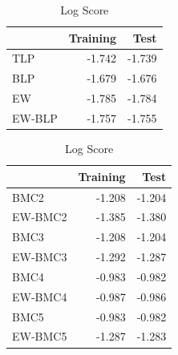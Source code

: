 \documentclass[
]{article}
\begin{document}
\begin{table}[H]
\caption{\label{tab:unnamed-chunk-18}Log Score}

\centering
\fontsize{8}{10}\selectfont
\begin{tabular}[t]{lrr}
\toprule
  & Training & Test\\
\midrule
TLP & -1.742 & -1.739\\
BLP & -1.679 & -1.676\\
EW & -1.785 & -1.784\\
EW-BLP & -1.757 & -1.755\\
\bottomrule
\end{tabular}
\centering
\begin{tabular}[t]{lrr}
\toprule
  & Training & Test\\
\midrule
BMC2 & -1.208 & -1.204\\
EW-BMC2 & -1.385 & -1.380\\
BMC3 & -1.208 & -1.204\\
EW-BMC3 & -1.292 & -1.287\\
BMC4 & -0.983 & -0.982\\
\addlinespace
EW-BMC4 & -0.987 & -0.986\\
BMC5 & -0.983 & -0.982\\
EW-BMC5 & -1.287 & -1.283\\
\bottomrule
\end{tabular}
\end{table}

\clearpage
\end{document}
